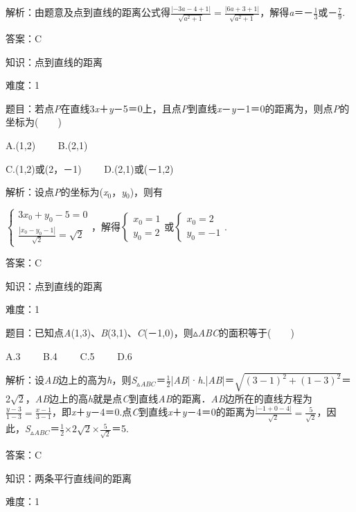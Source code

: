 \documentclass{article} %
\begin{document}
解析：由题意及点到直线的距离公式得$\frac{|-3a-4+1|}{\sqrt{a^2+1}}=\frac{|6a+3+1|}{\sqrt{a^2+1}}$，解得\textit{a}＝－$\frac{1}{3}$或－$\frac{7}{9}$.

答案：C

知识：点到直线的距离

难度：1

题目：若点\textit{P}在直线3\textit{x}＋\textit{y}－5＝0上，且点\textit{P}到直线\textit{x}－\textit{y}－1＝0的距离为，则点\textit{P}的坐标为(　　)

A.(1,2)　　  B.(2,1)

C.(1,2)或(2，－1)　　 D.(2,1)或(－1,2)

解析：设点\textit{P}的坐标为(\textit{x}${}_{0}$，\textit{y}${}_{0}$)，则有

$\left\{\begin{array}{l} 3x_0+y_0-5=0\\ \frac{|x_0-y_0-1|}{\sqrt{2}}=\sqrt{2} \end{array}\right.$，解得$\left\{\begin{array}{l} x_0=1\\ y_0=2 \end{array}\right.$或$\left\{\begin{array}{l} x_0=2\\ y_0=-1 \end{array}\right.$.

答案：C

知识：点到直线的距离

难度：1

题目：已知点\textit{A}(1,3)、\textit{B}(3,1)、\textit{C}(－1,0)，则$\mathrm{\vartriangle}$\textit{ABC}的面积等于(　　)

A.3　　 B.4　　 C.5　　 D.6

解析：设\textit{AB}边上的高为\textit{h}，则\textit{S}${}_{\vartriangle }$\textit{${}_{ABC}$}＝$\frac{1}{2}$|\textit{AB}|·\textit{h}.|\textit{AB}|＝$\sqrt{(3-1)^2+(1-3)^2}$＝2$\sqrt{2}$，\textit{AB}边上的高\textit{h}就是点\textit{C}到直线\textit{AB}的距离．\textit{AB}边所在的直线方程为$\frac{y-3}{1-3}=\frac{x-1}{3-1}$，即\textit{x}＋\textit{y}－4＝0.点\textit{C}到直线\textit{x}＋\textit{y}－4＝0的距离为$\frac{|-1+0-4|}{\sqrt{2}}=\frac{5}{\sqrt{2}}$，因此，\textit{S}${}_{\vartriangle }$\textit{${}_{ABC}$}＝$\frac{1}{2}\mathrm{\times}2\sqrt{2}\mathrm{\times}\frac{5}{\sqrt{2}}$＝5.

答案：C

知识：两条平行直线间的距离

难度：1
\end{document}
